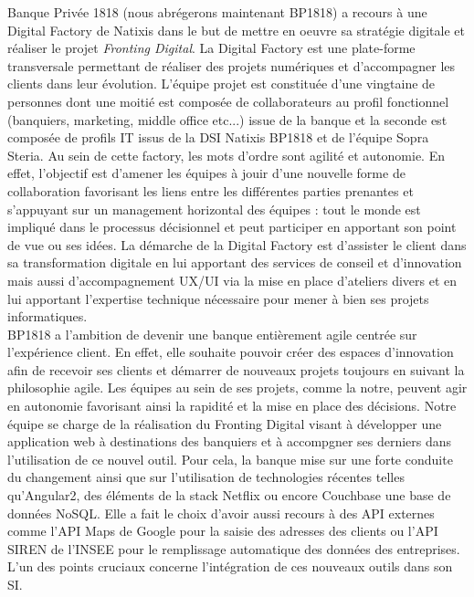 	Banque Privée 1818 (nous abrégerons maintenant BP1818) a recours à une Digital Factory de Natixis dans le but de mettre en oeuvre sa stratégie digitale et réaliser le projet \textit{Fronting Digital}. La Digital Factory est une plate-forme transversale permettant de réaliser des projets numériques et d'accompagner les clients dans leur évolution. L'équipe projet est constituée d'une vingtaine de personnes dont une moitié est composée de collaborateurs au profil fonctionnel (banquiers, marketing, middle office etc...) issue de la banque et la seconde est composée de profils IT issus de la DSI Natixis BP1818 et de l'équipe Sopra Steria. Au sein de cette factory, les mots d'ordre sont agilité et autonomie. En effet, l'objectif est d'amener les équipes à jouir d'une nouvelle forme de collaboration favorisant les liens entre les différentes parties prenantes et s'appuyant sur un management horizontal des équipes : tout le monde est impliqué dans le processus décisionnel et peut participer en apportant son point de vue ou ses idées. La démarche de la Digital Factory est d'assister le client dans sa transformation digitale en lui apportant des services de conseil et d'innovation mais aussi d'accompagnement UX/UI via la mise en place d'ateliers divers et en lui apportant l'expertise technique nécessaire pour mener à bien ses projets informatiques. \\
	
	BP1818 a l'ambition de devenir une banque entièrement agile centrée sur l'expérience client. En effet, elle souhaite pouvoir créer des espaces d'innovation afin de recevoir ses clients et démarrer de nouveaux projets toujours en suivant la philosophie agile. Les équipes au sein de ses projets, comme la notre, peuvent agir en autonomie favorisant ainsi la rapidité et la mise en place des décisions. Notre équipe se charge de la réalisation du Fronting Digital visant à développer une application web à destinations des banquiers et à accompgner ses derniers dans l'utilisation de ce nouvel outil. Pour cela, la banque mise sur une forte conduite du changement ainsi que sur l'utilisation de technologies récentes telles qu'Angular2, des éléments de la stack Netflix ou encore Couchbase une base de données NoSQL. Elle a fait le choix d'avoir aussi recours à des API externes comme l'API Maps de Google pour la saisie des adresses des clients ou l'API SIREN de l'INSEE pour le remplissage automatique des données des entreprises. L'un des points cruciaux concerne l'intégration de ces nouveaux outils dans son SI. \\
	
